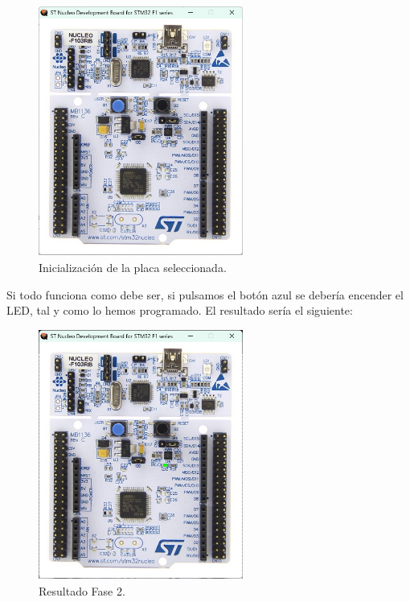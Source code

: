 \documentclass[11pt,a4paper]{article}
\begin{document}
	\begin{figure}[h!]
		\centering
		\includegraphics[width=0.6\textwidth]{placa-empty.png}
		\caption{Inicialización de la placa seleccionada.}
		\label{fig:placa-vacia}
	\end{figure}
	
	Si todo funciona como debe ser, si pulsamos el botón azul se debería encender el LED, tal y como lo hemos programado. El resultado sería el siguiente:
	
		\begin{figure}[h!]
		\centering
		\includegraphics[width=0.6\textwidth]{placa-led.png}
		\caption{Resultado Fase 2.}
		\label{fig:placa-led}
	\end{figure}
	
\end{document}
